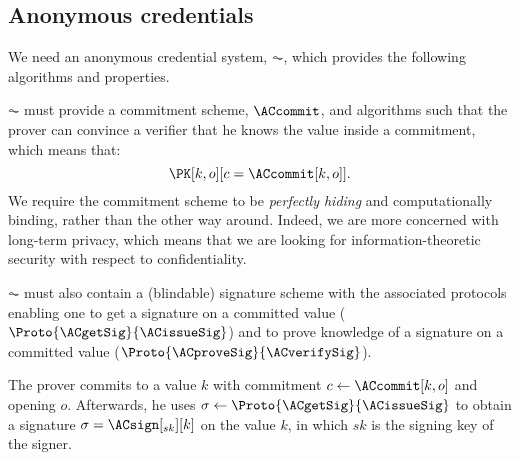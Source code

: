 \subsection{Anonymous credentials}%
\label{ZK-anon-cred}


We need an anonymous credential system, \(\AC\), which provides the following algorithms and properties.

\(\AC\) must provide a commitment scheme, \(\ACcommit\), and algorithms such that the prover can convince a verifier that he knows the value inside a commitment, which means that:
\begin{equation*}
  \PK[k, o][c = \ACcommit[k,o]].
\end{equation*}
We require the commitment scheme to be \emph{perfectly hiding} and computationally binding, rather than the other way around.
Indeed, we are more concerned with long-term privacy, which means that we are looking for information-theoretic security with respect to confidentiality.

\(\AC\) must also contain a (blindable) signature scheme with the associated protocols enabling one to get a signature on a committed value (\(\Proto{\ACgetSig}{\ACissueSig}\)) and to prove knowledge of a signature on a committed value (\(\Proto{\ACproveSig}{\ACverifySig}\)).

The prover commits to a value \(k\) with commitment \(c\gets \ACcommit[k, o]\) and opening \(o\).
Afterwards, he uses \(\sigma\gets \Proto{\ACgetSig}{\ACissueSig}\) to obtain a signature \(\sigma = \ACsign[_{sk}][k]\) on the value \(k\), in which \(sk\) is the signing key of the signer.

